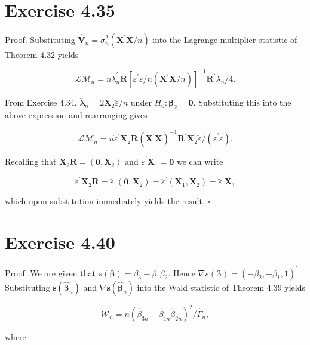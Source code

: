 \documentclass[10pt]{article}
\begin{document}
\section*{Exercise 4.35}
Proof. Substituting $\hat{\mathbf{V}}_{n}=\ddot{\sigma}_{n}^{2}\left(\mathbf{X}^{\prime} \mathbf{X} / n\right)$ into the Lagrange multiplier statistic of Theorem 4.32 yields

$$
\mathcal{L} \mathcal{M}_{n}=n \ddot{\lambda}_{n}^{\prime} \mathbf{R}\left[\ddot{\varepsilon}^{\prime} \ddot{\varepsilon} / n\left(\mathbf{X}^{\prime} \mathbf{X} / n\right)\right]^{-1} \mathbf{R}^{\prime} \ddot{\lambda}_{n} / 4 .
$$

From Exercise 4.34, $\ddot{\boldsymbol{\lambda}}_{n}=2 \mathbf{X}_{2}^{\prime} \ddot{\varepsilon} / n$ under $H_{0}: \boldsymbol{\beta}_{2}=\mathbf{0}$. Substituting this into the above expression and rearranging gives

$$
\mathcal{L} \mathcal{M}_{n}=n \ddot{\varepsilon}^{\prime} \mathbf{X}_{2} \mathbf{R}\left(\mathbf{X}^{\prime} \mathbf{X}\right)^{-1} \mathbf{R}^{\prime} \mathbf{X}_{2}^{\prime} \ddot{\varepsilon} /\left(\ddot{\varepsilon}^{\prime} \ddot{\varepsilon}\right) .
$$

Recalling that $\mathbf{X}_{2} \mathbf{R}=\left(\mathbf{0}, \mathbf{X}_{2}\right)$ and $\ddot{\varepsilon}^{\prime} \mathbf{X}_{1}=\mathbf{0}$ we can write

$$
\ddot{\varepsilon}^{\prime} \mathbf{X}_{2} \mathbf{R}=\ddot{\varepsilon}^{\prime}\left(\mathbf{0}, \mathbf{X}_{2}\right)=\ddot{\varepsilon}^{\prime}\left(\mathbf{X}_{1}, \mathbf{X}_{2}\right)=\ddot{\varepsilon}^{\prime} \mathbf{X},
$$

which upon substitution immediately yields the result. \(\square\)

\section*{Exercise 4.40}
Proof. We are given that $s(\boldsymbol{\beta})=\beta_{3}-\beta_{1} \beta_{2}$. Hence $\nabla s(\boldsymbol{\beta})=\left(-\beta_{2},-\beta_{1}, 1\right)^{\prime}$. Substituting $\boldsymbol{s}\left(\hat{\boldsymbol{\beta}}_{n}\right)$ and $\nabla \mathbf{s}\left(\hat{\boldsymbol{\beta}}_{n}\right)$ into the Wald statistic of Theorem 4.39 yields

$$
\mathcal{W}_{n}=n\left(\hat{\beta}_{3 n}-\hat{\beta}_{1 n} \hat{\beta}_{2 n}\right)^{2} / \hat{\Gamma}_{n},
$$

where
\end{document}
